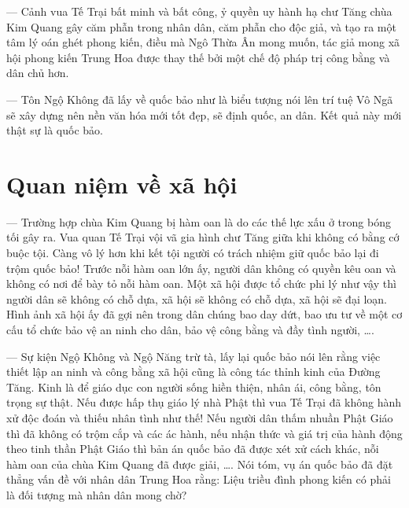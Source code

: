 — Cảnh vua Tế Trại bất minh và bất công, ỷ quyền uy hành hạ chư Tăng chùa Kim Quang gây căm phẫn trong nhân dân, căm phẫn cho độc giả, và tạo ra một tâm lý oán ghét phong kiến, điều mà Ngô Thừa Ân mong muốn, tác giả mong xã hội phong kiến Trung Hoa được thay thế bởi một chế độ pháp trị công bằng và dân chủ hơn.

— Tôn Ngộ Không đã lấy về quốc bảo như là biểu tượng nói lên trí tuệ Vô Ngã sẽ xây dựng nên nền văn hóa mới tốt đẹp, sẽ định quốc, an dân. Kết quả này mới thật sự là quốc bảo.

\section{Quan niệm về xã hội} %
\label{sec:62_63_xa_hoi}

— Trường hợp chùa Kim Quang bị hàm oan là do các thế lực xấu ở trong bóng tối gây ra. Vua quan Tế Trại vội vã gia hình chư Tăng giữa khi không có bằng cớ buộc tội. Càng vô lý hơn khi kết tội người có trách nhiệm giữ quốc bảo lại đi trộm quốc bảo! Trước nỗi hàm oan lớn ấy, người dân không có quyền kêu oan và không có nơi để bày tỏ nỗi hàm oan. Một xã hội được tổ chức phi lý như vậy thì người dân sẽ không có chỗ dựa, xã hội sẽ không có chỗ dựa, xã hội sẽ đại loạn. Hình ảnh xã hội ấy đã gợi nên trong dân chúng bao day dứt, bao ưu tư về một cơ cấu tổ chức bảo vệ an ninh cho dân, bảo vệ công bằng và đầy tình người, \ldots.

— Sự kiện Ngộ Không và Ngộ Năng trừ tà, lấy lại quốc bảo nói lên rằng việc thiết lập an ninh và công bằng xã hội cũng là công tác thỉnh kinh của Đường Tăng. Kinh là để giáo dục con người sống hiền thiện, nhân ái, công bằng, tôn trọng sự thật. Nếu được hấp thụ giáo lý nhà Phật thì vua Tế Trại đã không hành xử độc đoán và thiếu nhân tình như thế! Nếu người dân thấm nhuần Phật Giáo thì đã không có trộm cắp và các ác hành, nếu nhận thức và giá trị của hành động theo tinh thần Phật Giáo thì bản án quốc bảo đã được xét xử cách khác, nỗi hàm oan của chùa Kim Quang đã được giải, \ldots. Nói tóm, vụ án quốc bảo đã đặt thẳng vấn đề với nhân dân Trung Hoa rằng: Liệu triều đình phong kiến có phải là đối tượng mà nhân dân mong chờ?
